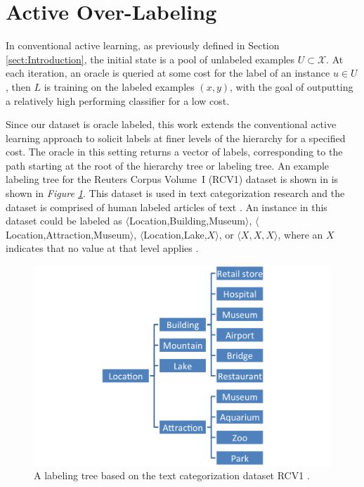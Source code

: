\documentclass[ms]{nuthesis}
\begin{document}
\section{Active Over-Labeling}
\label{sect:activeOverLabel}
In conventional active learning, as previously defined in Section \ref{sect:Introduction},
the initial state is a pool of unlabeled examples
$U \subset {\mathcal X}$. At each iteration, an oracle is queried at some
cost for the label of an instance $u \in U$, then $L$ is training on the labeled examples
$(x,y)$, with the goal of outputting a relatively high performing classifier for a low cost.
\par Since our dataset is oracle labeled, this work extends the conventional active
learning approach to solicit labels at finer levels of the hierarchy for a specified cost.
 The oracle in this setting returns a vector of labels, corresponding to the path starting
 at the root of the hierarchy tree or labeling tree. An example labeling tree for the
 Reuters Corpus Volume~I (RCV1) dataset is shown in is shown in
 \textit{Figure \ref{fig:exp-ontology}}. This dataset is used in text categorization
 research and the dataset is comprised of human labeled articles of text \cite{Lewis2004}.
 An instance in this dataset could be labeled as $\langle$Location,Building,Museum$\rangle$,
  $\langle$Location,Attraction,Museum$\rangle$,
$\langle$Location,Lake,$X\rangle$, or $\langle X,X,X \rangle$, where an $X$ indicates
that no value at that level applies \cite{yugi}.

\FloatBarrier
\begin{figure}[!htb]
	\centering
    \includegraphics[width=0.85\columnwidth]{fig/exp-ontology}
    \caption{A labeling tree based on the text categorization dataset RCV1 \cite{Lewis2004}.}
    \label{fig:exp-ontology}
\end{figure}
\FloatBarrier
\end{document}
